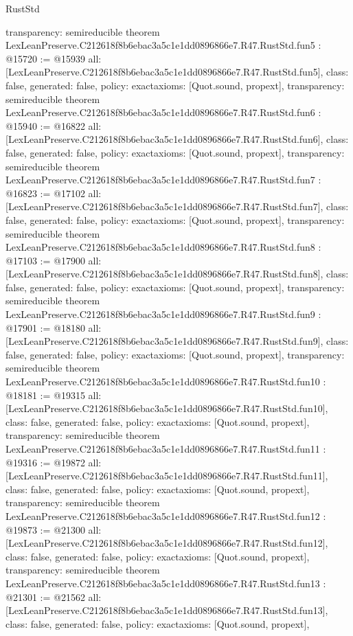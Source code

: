 \begin{lexlean}{RustStd}
\begin{coremodule}
{  transparency: semireducible
}
theorem LexLeanPreserve.C212618f8b6ebac3a5c1e1dd0896866e7.R47.RustStd.fun5 : @15720 := @15939 {
  all: [LexLeanPreserve.C212618f8b6ebac3a5c1e1dd0896866e7.R47.RustStd.fun5],
  class: false,
  generated: false,
  policy: exact{axioms: [Quot.sound, propext]},
  transparency: semireducible
}
theorem LexLeanPreserve.C212618f8b6ebac3a5c1e1dd0896866e7.R47.RustStd.fun6 : @15940 := @16822 {
  all: [LexLeanPreserve.C212618f8b6ebac3a5c1e1dd0896866e7.R47.RustStd.fun6],
  class: false,
  generated: false,
  policy: exact{axioms: [Quot.sound, propext]},
  transparency: semireducible
}
theorem LexLeanPreserve.C212618f8b6ebac3a5c1e1dd0896866e7.R47.RustStd.fun7 : @16823 := @17102 {
  all: [LexLeanPreserve.C212618f8b6ebac3a5c1e1dd0896866e7.R47.RustStd.fun7],
  class: false,
  generated: false,
  policy: exact{axioms: [Quot.sound, propext]},
  transparency: semireducible
}
theorem LexLeanPreserve.C212618f8b6ebac3a5c1e1dd0896866e7.R47.RustStd.fun8 : @17103 := @17900 {
  all: [LexLeanPreserve.C212618f8b6ebac3a5c1e1dd0896866e7.R47.RustStd.fun8],
  class: false,
  generated: false,
  policy: exact{axioms: [Quot.sound, propext]},
  transparency: semireducible
}
theorem LexLeanPreserve.C212618f8b6ebac3a5c1e1dd0896866e7.R47.RustStd.fun9 : @17901 := @18180 {
  all: [LexLeanPreserve.C212618f8b6ebac3a5c1e1dd0896866e7.R47.RustStd.fun9],
  class: false,
  generated: false,
  policy: exact{axioms: [Quot.sound, propext]},
  transparency: semireducible
}
theorem LexLeanPreserve.C212618f8b6ebac3a5c1e1dd0896866e7.R47.RustStd.fun10 : @18181 := @19315 {
  all: [LexLeanPreserve.C212618f8b6ebac3a5c1e1dd0896866e7.R47.RustStd.fun10],
  class: false,
  generated: false,
  policy: exact{axioms: [Quot.sound, propext]},
  transparency: semireducible
}
theorem LexLeanPreserve.C212618f8b6ebac3a5c1e1dd0896866e7.R47.RustStd.fun11 : @19316 := @19872 {
  all: [LexLeanPreserve.C212618f8b6ebac3a5c1e1dd0896866e7.R47.RustStd.fun11],
  class: false,
  generated: false,
  policy: exact{axioms: [Quot.sound, propext]},
  transparency: semireducible
}
theorem LexLeanPreserve.C212618f8b6ebac3a5c1e1dd0896866e7.R47.RustStd.fun12 : @19873 := @21300 {
  all: [LexLeanPreserve.C212618f8b6ebac3a5c1e1dd0896866e7.R47.RustStd.fun12],
  class: false,
  generated: false,
  policy: exact{axioms: [Quot.sound, propext]},
  transparency: semireducible
}
theorem LexLeanPreserve.C212618f8b6ebac3a5c1e1dd0896866e7.R47.RustStd.fun13 : @21301 := @21562 {
  all: [LexLeanPreserve.C212618f8b6ebac3a5c1e1dd0896866e7.R47.RustStd.fun13],
  class: false,
  generated: false,
  policy: exact{axioms: [Quot.sound, propext]},
}
\end{coremodule}
\end{lexlean}

